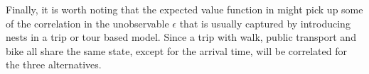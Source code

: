 Finally, it is worth noting that the expected value function in  might pick up some of the correlation in the unobservable $\epsilon$ that is usually captured by introducing nests in a trip or tour based model. Since a trip with walk, public transport and bike all share the same state, except for the arrival time, \eutil will be correlated for the three alternatives.
